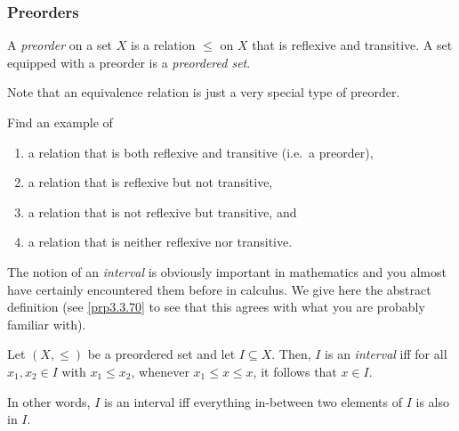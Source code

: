 \subsubsection{Preorders}

\begin{dfn}[Preorder]\label{dfnA.1.19}
A \emph{preorder} on a set $X$ is a relation $\leq$ on $X$ that is reflexive and transitive.  A set equipped with a preorder is a \emph{preordered set}.
\end{dfn}
\begin{rmk}
Note that an equivalence relation is just a very special type of preorder.
\end{rmk}
\begin{exr}
Find an example of
\begin{enumerate}
\item a relation that is both reflexive and transitive (i.e.~a preorder),
\item a relation that is reflexive but not transitive,
\item a relation that is not reflexive but transitive, and
\item a relation that is neither reflexive nor transitive.
\end{enumerate}
\end{exr}
The notion of an \emph{interval} is obviously important in mathematics and you almost have certainly encountered them before in calculus.  We give here the abstract definition (see \cref{prp3.3.70} to see that this agrees with what you are probably familiar with).
\begin{dfn}[Interval]\label{Interval}
Let $(X,\leq )$ be a preordered set and let $I\subseteq X$.  Then, $I$ is an \emph{interval} iff for all $x_1,x_2\in I$ with $x_1\leq x_2$, whenever $x_1\leq x\leq x$, it follows that $x\in I$.
\begin{rmk}
In other words, $I$ is an interval iff everything in-between two elements of $I$ is also in $I$.
\end{rmk}
\end{dfn}
